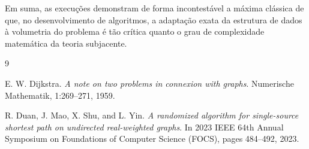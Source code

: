 \documentclass[12pt]{article}
\begin{document}
Em suma, as execuções demonstram de forma incontestável a máxima clássica de que, no desenvolvimento de algoritmos, a adaptação exata da estrutura de dados à volumetria do problema é tão crítica quanto o grau de complexidade matemática da teoria subjacente.

\begin{thebibliography}{9}

E. W. Dijkstra.
\textit{A note on two problems in connexion with graphs}.
Numerische Mathematik, 1:269--271, 1959.

R. Duan, J. Mao, X. Shu, and L. Yin.
\textit{A randomized algorithm for single-source shortest path on undirected real-weighted graphs}.
In 2023 IEEE 64th Annual Symposium on Foundations of Computer Science (FOCS), pages 484--492, 2023.

\end{thebibliography}
\end{document}
